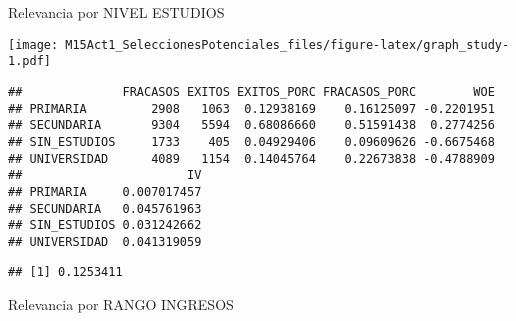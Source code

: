 \documentclass[]{article}
\newenvironment{Shaded}{\begin{snugshade}}{\end{snugshade}}
\newcommand{\KeywordTok}[1]{\textcolor[rgb]{0.13,0.29,0.53}{\textbf{#1}}}
\newcommand{\OperatorTok}[1]{\textcolor[rgb]{0.81,0.36,0.00}{\textbf{#1}}}
\newcommand{\NormalTok}[1]{#1}
\begin{document}
Relevancia por NIVEL ESTUDIOS

\begin{Shaded}
\end{Shaded}

\texttt{[image: M15Act1\_SeleccionesPotenciales\_files/figure-latex/graph\_study-1.pdf]}

\begin{Shaded}
\end{Shaded}

\begin{verbatim}
##              FRACASOS EXITOS EXITOS_PORC FRACASOS_PORC        WOE
## PRIMARIA         2908   1063  0.12938169    0.16125097 -0.2201951
## SECUNDARIA       9304   5594  0.68086660    0.51591438  0.2774256
## SIN_ESTUDIOS     1733    405  0.04929406    0.09609626 -0.6675468
## UNIVERSIDAD      4089   1154  0.14045764    0.22673838 -0.4788909
##                       IV
## PRIMARIA     0.007017457
## SECUNDARIA   0.045761963
## SIN_ESTUDIOS 0.031242662
## UNIVERSIDAD  0.041319059
\end{verbatim}

\begin{Shaded}
\end{Shaded}

\begin{verbatim}
## [1] 0.1253411
\end{verbatim}

Relevancia por RANGO INGRESOS

\begin{Shaded}
\end{Shaded}
\end{document}
